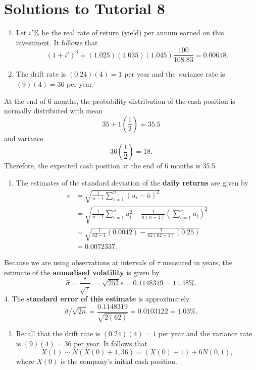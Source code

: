 \documentclass[
]{article}
\providecommand{\tightlist}{%
  \setlength{\itemsep}{0pt}\setlength{\parskip}{0pt}}
\theoremstyle{definition}
\theoremstyle{definition}
\theoremstyle{definition}
\theoremstyle{definition}
\theoremstyle{remark}
\begin{document}
\hypertarget{solutions-to-tutorial-8}{%
\section{Solutions to Tutorial 8}\label{solutions-to-tutorial-8}}

\begin{enumerate}
\def\labelenumi{\arabic{enumi}.}
\item
  Let \(i'\)\% be the real rate of return (yield) per annum earned on this investment. It follows that
  \[(1 + i')^3 = (1.025)(1.035)(1.045)\frac{100}{108.83} = 0.00618.\]
\item
  The drift rate is \((0.24)(4) = 1\) per year and the variance rate is \((9)(4) = 36\) per year.
\end{enumerate}

At the end of 6 months, the probability distribution of the cash position is normally distributed with mean
\[35 + 1(\frac{1}{2}) = 35.5\]
and variance
\[36(\frac{1}{2}) = 18.\]
Therefore, the expected cash position at the end of 6 months is 35.5.

\begin{enumerate}
\def\labelenumi{\arabic{enumi}.}
\setcounter{enumi}{2}
\tightlist
\item
  The estimates of the standard deviation of the \textbf{daily returns} are given by
  \[
  \begin{aligned}
   s &= \sqrt{\frac{1}{n-1} \sum_{i=1}^n (u_i - \bar{u})^2 } \\
       &= \sqrt{\frac{1}{n-1} \sum_{i=1}^n    u_i^2 - \frac{1}{n(n-1)}  \left(\sum_{i=1}^n u_i  \right)^2 } \\
       &= \sqrt{\frac{1}{62-1}(0.0042) - \frac{1}{62(62-1)}(0.25)   } \\
       &= 0.0072337.
  \end{aligned}
  \]
\end{enumerate}

Because we are using observations at intervals of \(\tau\) measured in years, the estimate of the \textbf{annualised volatility} is given by
\[ \hat{\sigma} = \frac{s}{\sqrt{\tau}}.= \sqrt{252}s = 0.1148319 = 11.48\%.\]
4. The \textbf{standard error of this estimate} is approximately \[\hat{\sigma}/\sqrt{2n} = \frac{0.1148319}{\sqrt{2(62)}} = 0.0103122 = 1.03\%.\]

\begin{enumerate}
\def\labelenumi{\arabic{enumi}.}
\setcounter{enumi}{4}
\tightlist
\item
  Recall that the drift rate is \((0.24)(4) = 1\) per year and the variance rate is \((9)(4) = 36\) per year. It follows that
  \[X(1) \sim N(X(0) + 1, 36) = (X(0) + 1) + 6N(0,1),\]
  where \(X(0)\) is the company's initial cash position.
\end{enumerate}
\end{document}
